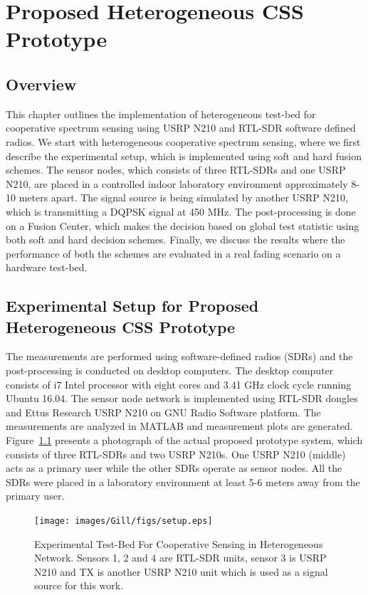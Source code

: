 \chapter{Proposed Heterogeneous CSS Prototype}
\label{chapter5}

\section{Overview}
This chapter outlines the implementation of heterogeneous test-bed for cooperative spectrum sensing using USRP N210 and RTL-SDR software defined radios. We start with heterogeneous cooperative spectrum sensing, where we first describe the experimental setup, which is implemented using soft and hard fusion schemes. The sensor nodes, which consists of three RTL-SDRs and one USRP N210, are placed in a controlled indoor laboratory environment approximately 8-10 meters apart. The signal source is being simulated by another USRP N210, which is transmitting a DQPSK signal at 450 MHz. The post-processing is done on a Fusion Center, which makes the decision based on global test statistic using both soft and hard decision schemes. Finally, we discuss the results where the performance of both the schemes are evaluated in a real fading scenario on a hardware test-bed. 

\section{Experimental Setup for Proposed Heterogeneous CSS Prototype}

The measurements are performed using software-defined radios (SDRs) and the post-processing is conducted on desktop computers. The desktop computer consists of i7 Intel processor with eight cores and 3.41 GHz clock cycle running Ubuntu 16.04. The sensor node network is implemented using RTL-SDR dongles and Ettus Research USRP N210 on GNU Radio Software platform. The measurements are analyzed in MATLAB and measurement plots are generated. Figure~\ref{expsetup} presents a photograph of the actual proposed prototype system, which consists of three RTL-SDRs and two USRP N210s. One USRP N210 (middle) acts as a primary user while the other SDRs operate as sensor nodes. All the SDRs were placed in a laboratory environment at least 5-6 meters away from the primary user.

\begin{figure}
\centering
	\texttt{[image: images/Gill/figs/setup.eps]} 
\caption{Experimental Test-Bed For Cooperative Sensing in Heterogeneous Network. Sensors 1, 2 and 4 are RTL-SDR units, sensor 3 is USRP N210 and TX is another USRP N210 unit which is used as a signal source for this work.}
\label{expsetup}
\end{figure}

